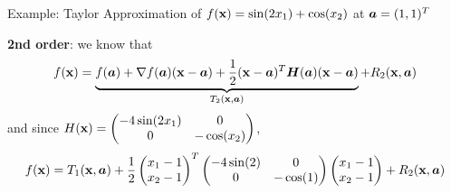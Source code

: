 \documentclass[11pt,compress,t,notes=noshow, xcolor=table]{beamer}
\begin{document}
\begin{frame2}{Example: Taylor Approximation of $\fx = \sin(2\MakeLowercase{x}_1) + \cos(\MakeLowercase{x}_2)$ at $\bm{\MakeLowercase{a}} = (1, 1)^T$}
\,\\
\begin{footnotesize}
\textbf{2nd order}: we know that
    $$
    f(\mathbf{x}) = \underbrace{f(\bm{a}) + \nabla f(\bm{a}) (\mathbf{x} - \bm{a}) + \frac{1}{2}(\mathbf{x} - \bm{a})^T\bm{H}(\bm{a})(\mathbf{x} - \bm{a})}_{T_2(\mathbf{x}, \bm{a})} + R_2(\mathbf{x},\bm{a})
    $$
    and since $H(\mathbf{x}) = \begin{pmatrix} -4 \sin(2x_1) & 0 \\ 0 & -\cos(x_2) \end{pmatrix}$,
    $$
        f(\mathbf{x}) = T_1(\mathbf{x}, \bm{a}) + \frac{1}{2}\begin{pmatrix}x_1 - 1 \\ x_2 - 1 \end{pmatrix}^T \begin{pmatrix} -4 \sin(2) & 0 \\ 0 & -\cos(1) \end{pmatrix} \begin{pmatrix}x_1 - 1 \\ x_2 - 1 \end{pmatrix} + R_2(\mathbf{x}, \bm{a})
    $$
\end{footnotesize}

\vspace*{-0.5\baselineskip}

\splitVCC
    {
    }
    {
    }

\end{frame2}





\endlecture
\end{document}
